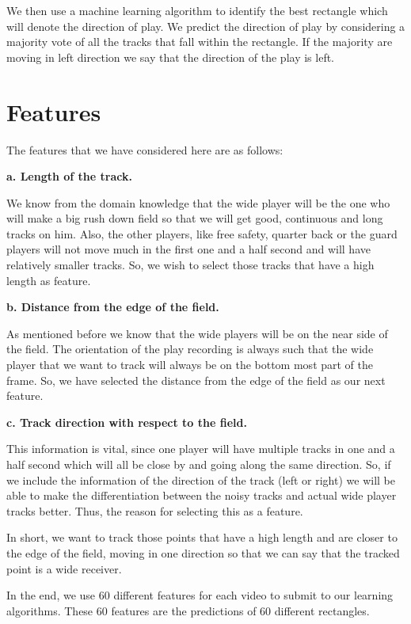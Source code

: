 \documentclass{article} %
\begin{document}
We then use a machine learning algorithm to identify the best rectangle which will denote the direction of play. We predict the direction of play by considering a majority vote of all the tracks that fall within the rectangle. If the majority are moving in left direction we say that the direction of the play is left.

\section{Features}

The features that we have considered here are as follows:

\textbf{a. Length of the track.}

We know from the domain knowledge that the wide player will be the one who will make a big rush down field so that we will get good, continuous and long tracks on him. Also, the other players, like free safety, quarter back or the guard players will not move much in the first one and a half second and will have relatively smaller tracks. So, we wish to select those tracks that have a high length as feature.

\textbf{b. Distance from the edge of the field.}

As mentioned before we know that the wide players will be on the near side of the field. The orientation of the play recording is always such that the wide player that we want to track will always be on the bottom most part of the frame. So, we have selected the distance from the edge of the field as our next feature. 

\textbf{c. Track direction with respect to the field.}

This information is vital, since one player will have multiple tracks in one and a half second which will all be close by and going along the same direction. So, if we include the information of the direction of the track (left or right) we will be able to make the differentiation between the noisy tracks and actual wide player tracks better. Thus, the reason for selecting this as a feature.

In short, we want to track those points that have a high length and are closer to the edge of the field, moving in one direction so that we can say that the tracked point is a wide receiver.

In the end, we use 60 different features for each video to submit to our learning algorithms. These 60 features are the predictions of 60 different rectangles.
\end{document}
